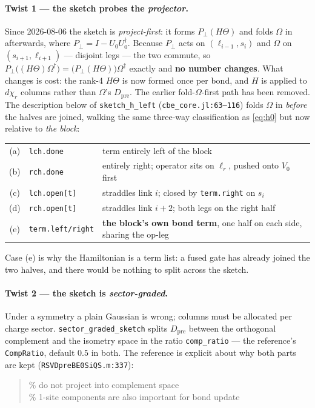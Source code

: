 \documentclass[11pt,a4paper]{article}
\newcommand{\code}[1]{\texttt{\small #1}}
\newcommand{\Dpre}{D_{\mathrm{pre}}}
\begin{document}
\paragraph{Twist 1 --- the sketch probes the \emph{projector}.} Since 2026-08-06 the
sketch is \emph{project-first}: it forms $P_\perp(H\Theta)$ and folds $\Omega$ in
afterwards, where $P_\perp = I - U_0U_0^\dagger$. Because $P_\perp$ acts on
$(\ell_{i-1},s_i)$ and $\Omega$ on $(s_{i+1},\ell_{i+1})$ --- disjoint legs --- the two
commute, so
$P_\perp\big((H\Theta)\Omega^\dagger\big) = \big(P_\perp(H\Theta)\big)\Omega^\dagger$
exactly and \textbf{no number changes}. What changes is cost: the rank-4 $H\Theta$ is now
formed once per bond, and $H$ is applied to $d\chi_r$ columns rather than $\Omega$'s
$D_{\mathrm{pre}}$. The earlier fold-$\Omega$-first path has been removed. The description
below of \code{sketch\_h\_left}
(\code{cbe\_core.jl:63--116}) folds $\Omega$ in \emph{before} the halves are joined, walking the
same three-way classification as \eqref{eq:h0} but now relative to \emph{the block}:
\begin{center}
\small
\begin{tabular}{@{}clp{8.2cm}@{}}
\toprule
(a) & \code{lch.done} & term entirely left of the block \\
(b) & \code{rch.done} & entirely right; operator sits on $\ell_r$, pushed onto $V_0$ first \\
(c) & \code{lch.open[t]} & straddles link $i$; closed by \code{term.right} on $s_i$ \\
(d) & \code{rch.open[t]} & straddles link $i+2$; both legs on the right half \\
(e) & \code{term.left/right} & \textbf{the block's own bond term}, one half on each side, sharing the op-leg \\
\bottomrule
\end{tabular}
\end{center}
Case (e) is why the Hamiltonian is a term list: a fused gate has already joined the two halves,
and there would be nothing to split across the sketch.

\paragraph{Twist 2 --- the sketch is \emph{sector-graded}.} Under a symmetry a plain Gaussian is
wrong; columns must be allocated per charge sector. \code{sector\_graded\_sketch} splits
$\Dpre$ between the orthogonal complement and the isometry space in the ratio
\code{comp\_ratio} --- the reference's \code{CompRatio}, default $0.5$ in both. The reference is
explicit about why both parts are kept (\code{RSVDpreBE0SiQS.m:337}):
\begin{quote}\ttfamily\footnotesize
\% do not project into complement space\\
\% 1-site components are also important for bond update
\end{quote}
\end{document}

